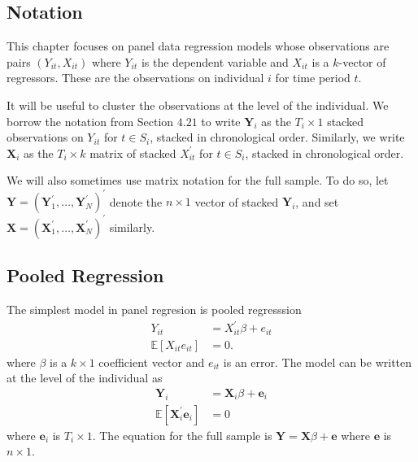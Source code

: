\documentclass[10pt]{article}
\begin{document}
\subsection{Notation}
This chapter focuses on panel data regression models whose observations are pairs $\left(Y_{i t}, X_{i t}\right)$ where $Y_{i t}$ is the dependent variable and $X_{i t}$ is a $k$-vector of regressors. These are the observations on individual $i$ for time period $t$.

It will be useful to cluster the observations at the level of the individual. We borrow the notation from Section $4.21$ to write $\boldsymbol{Y}_{i}$ as the $T_{i} \times 1$ stacked observations on $Y_{i t}$ for $t \in S_{i}$, stacked in chronological order. Similarly, we write $\boldsymbol{X}_{i}$ as the $T_{i} \times k$ matrix of stacked $X_{i t}^{\prime}$ for $t \in S_{i}$, stacked in chronological order.

We will also sometimes use matrix notation for the full sample. To do so, let $\boldsymbol{Y}=\left(\boldsymbol{Y}_{1}^{\prime}, \ldots, \boldsymbol{Y}_{N}^{\prime}\right)^{\prime}$ denote the $n \times 1$ vector of stacked $\boldsymbol{Y}_{i}$, and set $\boldsymbol{X}=\left(\boldsymbol{X}_{1}^{\prime}, \ldots, \boldsymbol{X}_{N}^{\prime}\right)^{\prime}$ similarly.

\subsection{Pooled Regression}
The simplest model in panel regresion is pooled regresssion
$$
\begin{aligned}
Y_{i t} &=X_{i t}^{\prime} \beta+e_{i t} \\
\mathbb{E}\left[X_{i t} e_{i t}\right] &=0 .
\end{aligned}
$$
where $\beta$ is a $k \times 1$ coefficient vector and $e_{i t}$ is an error. The model can be written at the level of the individual as
$$
\begin{aligned}
\boldsymbol{Y}_{i} &=\boldsymbol{X}_{i} \beta+\boldsymbol{e}_{i} \\
\mathbb{E}\left[\boldsymbol{X}_{i}^{\prime} \boldsymbol{e}_{i}\right] &=0
\end{aligned}
$$
where $\boldsymbol{e}_{i}$ is $T_{i} \times 1$. The equation for the full sample is $\boldsymbol{Y}=\boldsymbol{X} \beta+\boldsymbol{e}$ where $\boldsymbol{e}$ is $n \times 1$.
\end{document}
